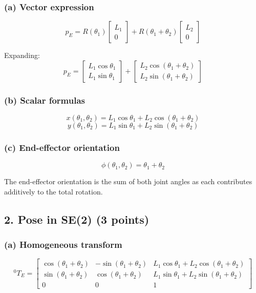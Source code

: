 \documentclass[11pt]{article}
\begin{document}
\subsubsection*{(a) Vector expression}
$$p_E = R(\theta_1) \begin{bmatrix} L_1 \\ 0 \end{bmatrix} + R(\theta_1 + \theta_2) \begin{bmatrix} L_2 \\ 0 \end{bmatrix}$$

Expanding:
$$p_E = \begin{bmatrix} L_1 \cos\theta_1 \\ L_1 \sin\theta_1 \end{bmatrix} + \begin{bmatrix} L_2 \cos(\theta_1 + \theta_2) \\ L_2 \sin(\theta_1 + \theta_2) \end{bmatrix}$$

\subsubsection*{(b) Scalar formulas}
$$x(\theta_1, \theta_2) = L_1 \cos\theta_1 + L_2 \cos(\theta_1 + \theta_2)$$
$$y(\theta_1, \theta_2) = L_1 \sin\theta_1 + L_2 \sin(\theta_1 + \theta_2)$$

\subsubsection*{(c) End-effector orientation}
$$\phi(\theta_1, \theta_2) = \theta_1 + \theta_2$$

The end-effector orientation is the sum of both joint angles as each contributes additively to the total rotation.

\subsection*{2. Pose in SE(2) (3 points)}
\subsubsection*{(a) Homogeneous transform}
$$^0 T_E = \begin{bmatrix}
\cos(\theta_1 + \theta_2) & -\sin(\theta_1 + \theta_2) & L_1\cos\theta_1 + L_2\cos(\theta_1 + \theta_2) \\
\sin(\theta_1 + \theta_2) & \cos(\theta_1 + \theta_2) & L_1\sin\theta_1 + L_2\sin(\theta_1 + \theta_2) \\
0 & 0 & 1
\end{bmatrix}$$
\end{document}
